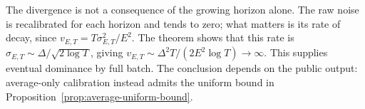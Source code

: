 The divergence is not a consequence of the growing horizon alone. The raw noise
is recalibrated for each horizon and tends to zero; what matters is its rate of
decay, since $v_{E,T}=T\sigma_{E,T}^2/E^2$. The theorem shows that this rate is
$\sigma_{E,T}\sim\Delta/\sqrt{2\log T}$, giving
$v_{E,T}\sim\Delta^2T/(2E^2\log T)\to\infty$. This supplies eventual dominance
by full batch. The conclusion depends on the public output: average-only
calibration instead admits the uniform bound in
Proposition~\ref{prop:average-uniform-bound}.
